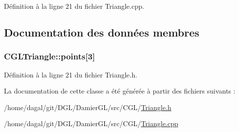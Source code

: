 Définition à la ligne 21 du fichier Triangle.\-cpp.



\subsection{Documentation des données membres}
\hypertarget{class_c_g_l_triangle_ad9fa3aa96d255554fe524c3e1aa68cee}{
\subsubsection[{points}]{ C\-G\-L\-Triangle\-::points\mbox{[}3\mbox{]}\hspace{0.3cm}{\ttfamily [protected]}}}\label{class_c_g_l_triangle_ad9fa3aa96d255554fe524c3e1aa68cee}


Définition à la ligne 21 du fichier Triangle.\-h.



La documentation de cette classe a été générée à partir des fichiers suivants \-:\begin{DoxyCompactItemize}
\item 
/home/dagal/git/\-D\-G\-L/\-Damier\-G\-L/src/\-C\-G\-L/\hyperlink{_triangle_8h}{Triangle.\-h}\item 
/home/dagal/git/\-D\-G\-L/\-Damier\-G\-L/src/\-C\-G\-L/\hyperlink{_triangle_8cpp}{Triangle.\-cpp}\end{DoxyCompactItemize}

